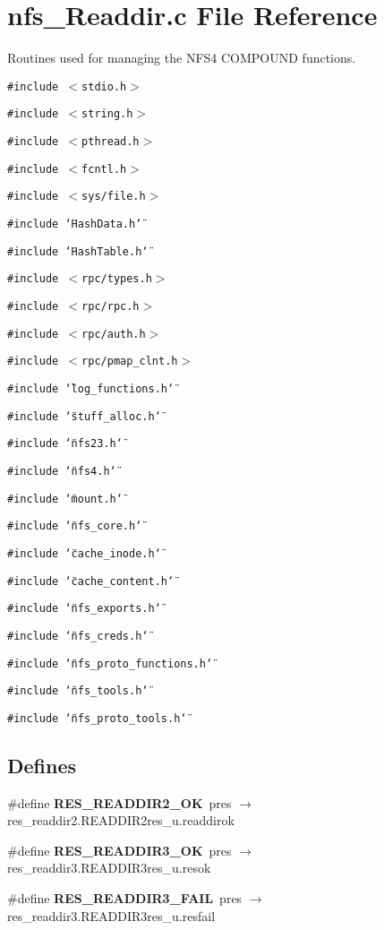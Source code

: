 \section{nfs\_\-Readdir.c File Reference}
\label{nfs__Readdir_8c}
Routines used for managing the NFS4 COMPOUND functions. 

{\tt \#include $<$stdio.h$>$}\par
{\tt \#include $<$string.h$>$}\par
{\tt \#include $<$pthread.h$>$}\par
{\tt \#include $<$fcntl.h$>$}\par
{\tt \#include $<$sys/file.h$>$}\par
{\tt \#include \char`\"{}Hash\-Data.h\char`\"{}}\par
{\tt \#include \char`\"{}Hash\-Table.h\char`\"{}}\par
{\tt \#include $<$rpc/types.h$>$}\par
{\tt \#include $<$rpc/rpc.h$>$}\par
{\tt \#include $<$rpc/auth.h$>$}\par
{\tt \#include $<$rpc/pmap\_\-clnt.h$>$}\par
{\tt \#include \char`\"{}log\_\-functions.h\char`\"{}}\par
{\tt \#include \char`\"{}stuff\_\-alloc.h\char`\"{}}\par
{\tt \#include \char`\"{}nfs23.h\char`\"{}}\par
{\tt \#include \char`\"{}nfs4.h\char`\"{}}\par
{\tt \#include \char`\"{}mount.h\char`\"{}}\par
{\tt \#include \char`\"{}nfs\_\-core.h\char`\"{}}\par
{\tt \#include \char`\"{}cache\_\-inode.h\char`\"{}}\par
{\tt \#include \char`\"{}cache\_\-content.h\char`\"{}}\par
{\tt \#include \char`\"{}nfs\_\-exports.h\char`\"{}}\par
{\tt \#include \char`\"{}nfs\_\-creds.h\char`\"{}}\par
{\tt \#include \char`\"{}nfs\_\-proto\_\-functions.h\char`\"{}}\par
{\tt \#include \char`\"{}nfs\_\-tools.h\char`\"{}}\par
{\tt \#include \char`\"{}nfs\_\-proto\_\-tools.h\char`\"{}}\par
\subsection*{Defines}
\begin{CompactItemize}
\item 
\#define {\bf RES\_\-READDIR2\_\-OK}\ pres $\rightarrow$ res\_\-readdir2.READDIR2res\_\-u.readdirok
\item 
\#define {\bf RES\_\-READDIR3\_\-OK}\ pres $\rightarrow$ res\_\-readdir3.READDIR3res\_\-u.resok
\item 
\#define {\bf RES\_\-READDIR3\_\-FAIL}\ pres $\rightarrow$ res\_\-readdir3.READDIR3res\_\-u.resfail
\end{CompactItemize}
